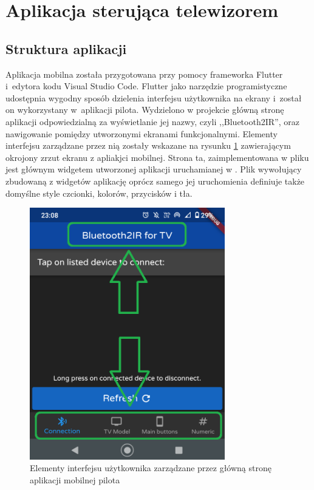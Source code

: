 \documentclass[12pt,twoside]{article}
\begin{document}
\section{Aplikacja sterująca telewizorem}
\subsection{Struktura aplikacji}
Aplikacja mobilna została przygotowana przy pomocy frameworka Flutter i~edytora kodu Visual Studio Code. Flutter jako narzędzie programistyczne udostępnia wygodny sposób dzielenia interfejsu użytkownika na ekrany i~został on wykorzystany w~aplikacji pilota. Wydzielono w projekcie główną stronę aplikacji odpowiedzialną za wyświetlanie jej nazwy, czyli ,,Bluetooth2IR'', oraz nawigowanie pomiędzy utworzonymi ekranami funkcjonalnymi. Elementy interfejsu zarządzane przez nią zostały wskazane na rysunku \ref*{Fig:mainPageElements} zawierającym okrojony zrzut ekranu z apliakjci mobilnej. Strona ta, zaimplementowana w pliku  jest głównym widgetem utworzonej aplikacji uruchamianej w . Plik wywołujący zbudowaną z widgetów aplikację oprócz samego jej uruchomienia definiuje także domyślne style czcionki, kolorów, przycisków i tła.
\begin{figure}[ht]
   \centering
   \includegraphics[width=8.5cm]{images/mainPageElements.png}
   \caption{Elementy interfejsu użytkownika zarządzane przez główną stronę aplikacji mobilnej pilota}
   \label{Fig:mainPageElements}
\end{figure}
\end{document}
